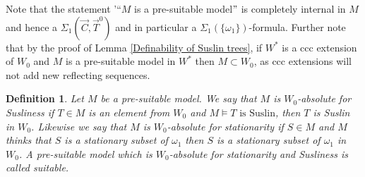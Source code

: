 \documentclass[a4paper,11pt]{article}
\newtheorem{definition}[theorem]{Definition}
\begin{document}
Note that the statement '``$M$ is a pre-suitable model$"$ is completely internal in $M$ and hence a $\Sigma_1(\vec{C}, \vec{T}^0)$ and in particular a $\Sigma_1 (\{\omega_1 \} )$-formula.
Further note that by the proof of Lemma \ref{Definability of Suslin trees}, if $W^{\ast}$ is a ccc extension of $W_0$ and $M$ is a pre-suitable
model in $W^{\ast}$ then $M \subset W_0$, as ccc extensions will not add new reflecting sequences.
\begin{definition}
 Let $M$ be a pre-suitable model. We say that $M$ is $W_0$-absolute for Susliness
 if $T \in M$ is an element from $W_0$ and $M \models T \text{ is Suslin}$, then $T$ is Suslin in $W_0$.
 Likewise we say that $M$ is $W_0$-absolute for stationarity if
 $S \in M$ and $M$ thinks that
 $S$ is a stationary subset of $\omega_1$ then $S$ is a stationary subset of $\omega_1$ in $W_0$. 
 A pre-suitable model which is $W_0$-absolute for stationarity and Susliness is called suitable.
\end{definition}
\end{document}
